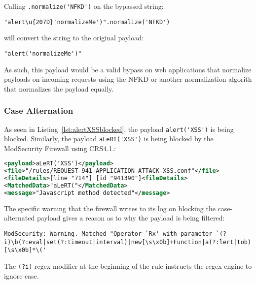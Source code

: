 Calling \verb|.normalize('NFKD')| on the bypassed string:

\begin{lstlisting}[style=basicStyle]
"alert\u{207D}'normalizeMe')".normalize('NFKD')
\end{lstlisting}

will convert the string to the original payload:

\begin{lstlisting}[style=basicStyle]
"alert('normalizeMe')"
\end{lstlisting}

As such, this payload would be a valid bypass on web applications that normalize payloads on incoming requests using the NFKD or another normalization algorith that normalizes the payload equally. 


\subsubsection{Case Alternation}
\label{sec:casealternationevaluation}
As seen in Listing~\ref{lst:alertXSSblocked}, the payload \verb|alert('XSS')| is being blocked. Similarly, the payload \verb|aLeRT('XSS')| is being blocked by the ModSecurity Firewall using CRS4.1.:

\begin{lstlisting}[style=ruleStyle, language=XML, caption=alert("normalizeMe") blocked, label=lst:alertcasealternationblocked]
<payload>aLeRT('XSS')</payload>
<file>"/rules/REQUEST-941-APPLICATION-ATTACK-XSS.conf"</file>
<fileDetails>[line "714"] [id "941390"]<fileDetails>
<MatchedData>"aLeRT("</MatchedData>
<message>"Javascript method detected"</message>
\end{lstlisting}

The specific warning that the firewall writes to its log on blocking the case-alternated payload gives a reason as to why the payload is being filtered:
\begin{lstlisting}[style=basicStyle, caption=ModSecurity warning on case alternated payloads, label={lst:modsecwarning}]
	ModSecurity: Warning. Matched "Operator `Rx' with parameter `(?i)\b(?:eval|set(?:timeout|interval)|new[\s\x0b]+Function|a(?:lert|tob)|btoa|prompt|confirm)[\s\x0b]*\('
\end{lstlisting}
The \verb|(?i)| regex modifier at the beginning of the rule instructs the regex engine to ignore case.


